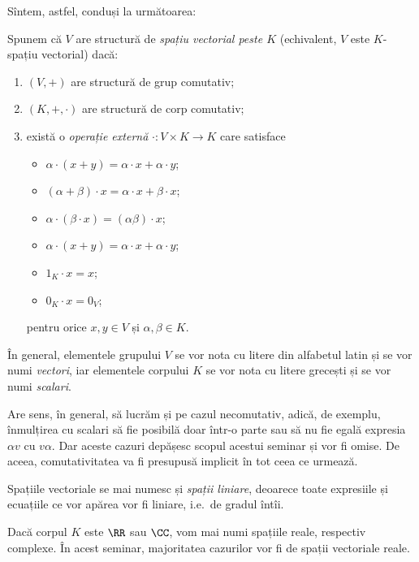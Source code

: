 Sîntem, astfel, conduși la următoarea:
\begin{definition}\label{def:sp-vect}
  Spunem că $ V $ are structură de \emph{spațiu vectorial peste $ K $} (echivalent,
  $ V $ este $ K $-spațiu vectorial) dacă:
  \begin{enumerate}
  \item $ (V, +) $ are structură de grup comutativ;
  \item $ (K, +, \cdot) $ are structură de corp comutativ;
  \item există o \emph{operație externă} $ \cdot : V \times K \to K $ care satisface
    \begin{itemize}
    \item $ \alpha \cdot (x + y) = \alpha \cdot x + \alpha \cdot y $;
    \item $ (\alpha + \beta) \cdot x = \alpha \cdot x + \beta \cdot x $;
    \item $ \alpha \cdot (\beta \cdot x) = (\alpha \beta) \cdot x $;
    \item $ \alpha \cdot (x + y) = \alpha \cdot x + \alpha \cdot y $;
    \item $ 1_K \cdot x = x $;
    \item $ 0_K \cdot x = 0_V $;
    \end{itemize}
    pentru orice $ x, y \in V $ și $ \alpha, \beta \in K $.
  \end{enumerate}
  În general, elementele grupului $ V $ se vor nota cu litere din alfabetul latin
  și se vor numi \emph{vectori}, iar elementele corpului $ K $ se vor nota cu litere
  grecești și se vor numi \emph{scalari}.
\end{definition}

\begin{remark}\label{rk:spatiu-necom}
  Are sens, în general, să lucrăm și pe cazul necomutativ, adică, de exemplu,
  înmulțirea cu scalari să fie posibilă doar într-o parte sau să nu fie egală expresia
  $ \alpha v $ cu $ v \alpha $. Dar aceste cazuri depășesc scopul acestui seminar și vor
  fi omise. De aceea, comutativitatea va fi presupusă implicit în tot ceea ce urmează.
\end{remark}

Spațiile vectoriale se mai numesc și \emph{spații liniare}, deoarece toate expresiile
și ecuațiile ce vor apărea vor fi liniare, i.e.\ de gradul întîi.

Dacă corpul $ K $ este $ \RR $ sau $ \CC $, vom mai numi spațiile reale, respectiv complexe.
În acest seminar, majoritatea cazurilor vor fi de spații vectoriale reale.

